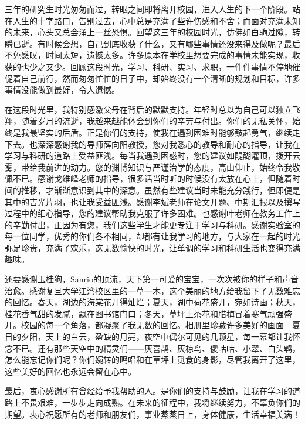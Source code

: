 \documentclass[type=master,twoside]{fduthesis}
\begin{document}
\begin{acknowledgements}

三年的研究生时光匆匆而过，转眼之间即将离开校园，进入人生的下一个阶段。站在人生的十字路口，告别过去，心中总是充满了些许伤感和不舍；而面对充满未知的未来，心头又总会涌上一丝恐惧。回望这三年的校园时光，仿佛如白驹过隙，转瞬已逝。有时候会想，自己到底收获了什么，又有哪些事情还没来得及做呢？最后不免感叹，时间太短，遗憾太多。许多原本在学校里想要完成的事情未能实现，收获的也少之又少。回顾这段时光，学习、科研、实习、求职，一件件事情不停地催促着自己前行，然而匆匆忙忙的日子中，却始终没有一个清晰的规划和目标，许多事情没能做到最好，令人遗憾。

在这段时光里，我特别感激父母在背后的默默支持。年轻时总以为自己可以独立飞翔，随着岁月的流逝，我越来越能体会到你们的辛劳与付出。你们的无私关怀，始终是我最坚实的后盾。正是你们的支持，使我在遇到困难时能够鼓起勇气，继续走下去。也深深感谢我的导师薛向阳教授，您对我悉心的教导和耐心的指导，让我在学习与科研的道路上受益匪浅。每当我遇到困惑时，您的建议如醍醐灌顶，拨开云雾，带给我前进的动力。您的渊博知识与严谨治学的态度，高山仰止，始终令我敬佩不已。感谢戈维峰老师的指导，很多话当时听的时候没有太放在心上，但随着时间的推移，才渐渐意识到其中的深意。虽然有些建议当时未能充分践行，但即便是其中的吉光片羽，也让我受益匪浅。感谢李斌老师在论文开题、中期汇报以及撰写过程中的细心指导，您的建议帮助我克服了许多困难。也感谢叶老师在教务工作上的辛勤付出，正因为有您，我们这些学生才能更专注于学习与科研。感谢实验室的每一位同学，优秀的你们各不相同，却都有让我学习的地方，与大家在一起的时光弥足珍贵，充满了欢乐，这无数愉快的时光，让单调的学习和科研生活也变得充满趣味。

还要感谢玉桂狗，Sanrio的顶流，天下第一可爱的宝宝，一次次被你的样子和声音治愈。感谢复旦大学江湾校区里的一草一木，这个美丽的地方给我留下了无数难忘的回忆。春天，湖边的海棠花开得灿烂；夏天，湖中荷花盛开，宛如诗画；秋天，桂花香气甜的发腻，飘在图书馆门口；冬天，草坪上茶花和腊梅冒着寒气顽强盛开。校园的每一个角落，都凝聚了我无数的回忆。相册里珍藏许多美好的画面—夏日的夕阳，天上的白云，盈缺的月亮，夜空中偶尔可见的几颗星，每一幕都让我怀念不已。还有那些天空中的精灵们——灰喜鹊、灰椋鸟、傻咕咕、小翠、白头鹎，怎么能忘记你们呢？你们婉转的鸣唱和在草坪上觅食的身影，尽管我离开了这里，这些美好的回忆也永远会留在心中。

最后，衷心感谢所有曾经给予我帮助的人。是你们的支持与鼓励，让我在学习的道路上不畏艰难，一步步走向成熟。在未来的征程中，我将继续努力，不辜负你们的期望。衷心祝愿所有的老师和朋友们，事业蒸蒸日上，身体健康，生活幸福美满！


\end{acknowledgements}
\end{document}
